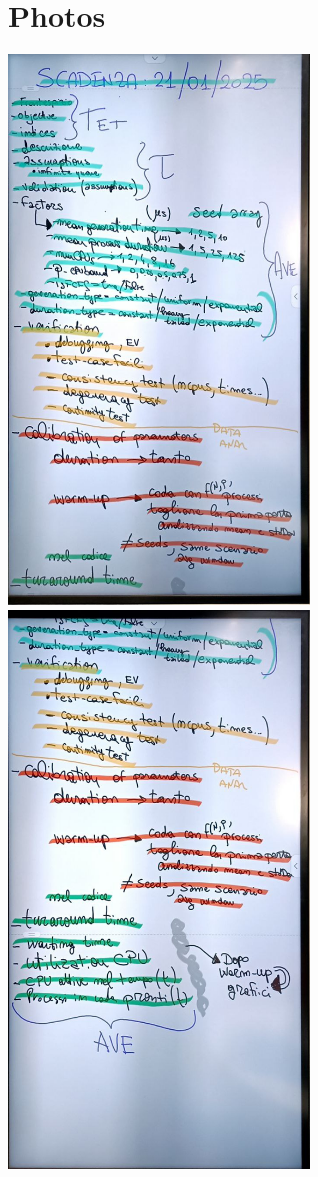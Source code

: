 \chapter{Photos}

\includegraphics[width=0.6\textwidth]{images/example/pag1.jpeg}
\includegraphics[width=0.6\textwidth]{images/example/pag2.jpeg}
